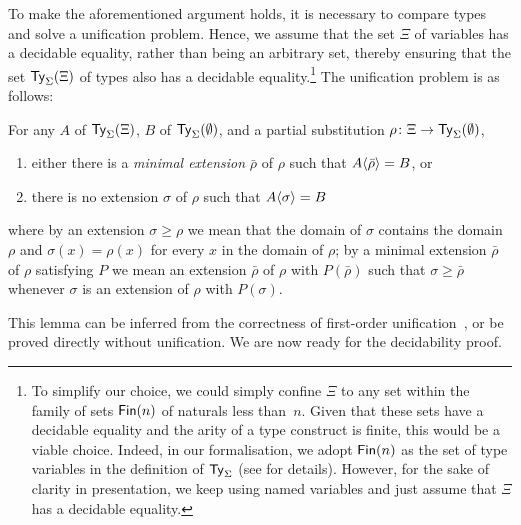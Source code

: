 To make the aforementioned argument holds, it is necessary to compare types and solve a unification problem.
Hence, we assume that the set $\Xi$ of variables has a decidable equality, rather than being an arbitrary set, thereby ensuring that the set $\mathsf{Ty}_{\Sigma}(\Xi)$ of types also has a decidable equality.\footnote{%
To simplify our choice, we could simply confine $\Xi$ to any set within the family of sets $\mathsf{Fin}(n)$ of naturals less than~$n$.
Given that these sets have a decidable equality and the arity of a type construct is finite, this would be a viable choice.
Indeed, in our formalisation, we adopt $\mathsf{Fin}(n)$ as the set of type variables in the definition of $\mathsf{Ty}_{\Sigma}$ (see  for details).
However, for the sake of clarity in presentation, we keep using named variables and just assume that $\Xi$ has a decidable equality.}
The unification problem is as follows:
\begin{lemma}
  For any\/ $A$ of\/ $\mathsf{Ty}_{\Sigma}(\Xi)$, $B$ of\/ $\mathsf{Ty}_{\Sigma}(\emptyset)$, and a partial substitution $\rho \colon \Xi \to \mathsf{Ty}_{\Sigma}(\emptyset)$, 
  \begin{enumerate}
    \item either there is a \emph{minimal extension} $\bar{\rho}$ of $\rho$ such that ${A}\!\left<{\bar{\rho}}\right> = B$, or 
    \item there is no extension $\sigma$ of $\rho$ such that ${A}\!\left<{\sigma}\right> = B$
  \end{enumerate}
  where by an extension $\sigma \geq \rho$ we mean that the domain of $\sigma$ contains the domain $\rho$ and $\sigma(x) = \rho(x)$ for every $x$ in the domain of $\rho$; by a minimal extension $\bar{\rho}$ of $\rho$ satisfying $P$ we mean an extension $\bar{\rho}$ of $\rho$ with $P(\bar{\rho})$ such that $\sigma \geq \bar{\rho}$ whenever $\sigma$ is an extension of $\rho$ with $P(\sigma)$.
\end{lemma}
This lemma can be inferred from the correctness of first-order unification~\citep{McBride2003,McBride2003a}, or be proved directly without unification.
We are now ready for the decidability proof.

